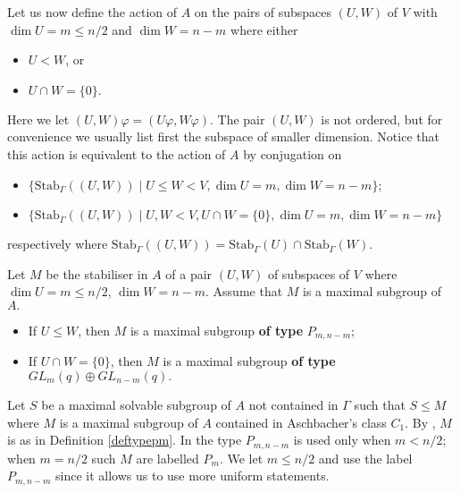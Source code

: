 Let us now define the action of $A$ on the pairs of subspaces $(U,W)$ of $V$ with $\dim U=m \le n/2$ and $\dim W=n-m$ where either
\begin{itemize}
\item  $U<W$, or
\item $U\cap W= \{0\}.$
\end{itemize}
 Here we let $(U,W) \varphi =(U\varphi, W \varphi).$ The pair $(U, W)$ is not ordered, but for convenience we usually list first the subspace of smaller dimension.  Notice that this action is equivalent to the action of $A$ by conjugation on 
 \begin{itemize}
\item {$\{\mathrm{Stab}_{\Gamma}((U,W)) \mid U \le W < V, \dim U=m, \dim W=n-m\}$};
\item $\{\mathrm{Stab}_{\Gamma}((U,W)) \mid U , W < V, U \cap W = \{0\}, \dim U=m, \dim W=n-m\}$ 
 \end{itemize}
respectively
where $\mathrm{Stab}_{\Gamma}((U,W))=\mathrm{Stab}_{\Gamma}(U) \cap \mathrm{Stab}_{\Gamma}(W).$ 



\begin{Def}
\label{deftypepm}
Let $M$ be the stabiliser in $A$ of a pair $(U,W)$ of subspaces of $V$ where $\dim U=m \le n/2$, $\dim W=n-m$. Assume that $M$ is a maximal subgroup of $A.$
\begin{itemize}
\item If $U \le W$, then $M$ is a maximal subgroup {\bf of type} $P_{m,n-m};$
\item If $U\cap W=\{0\}$, then $M$ is a maximal subgroup {\bf of type} $GL_m(q) \oplus GL_{n-m}(q).$
\end{itemize}
\end{Def}
Let $S$  be a maximal solvable subgroup of $A$ not contained in $\Gamma$ such that $S \le M$ where $M$ is a maximal subgroup of $A$ contained in Aschbacher's class $\mathit{C_1}.$ By \cite[\S 4.1]{kleidlieb}, $M$ is as in Definition \ref{deftypepm}.
In \cite[\S 4.1]{kleidlieb} the type $P_{m,n-m}$ is used only when $m<n/2;$ when $m=n/2$ such $M$ are labelled $P_m$. We let $m \le n/2$ and use the label $P_{m,n-m}$ since it allows us to use more uniform statements.

